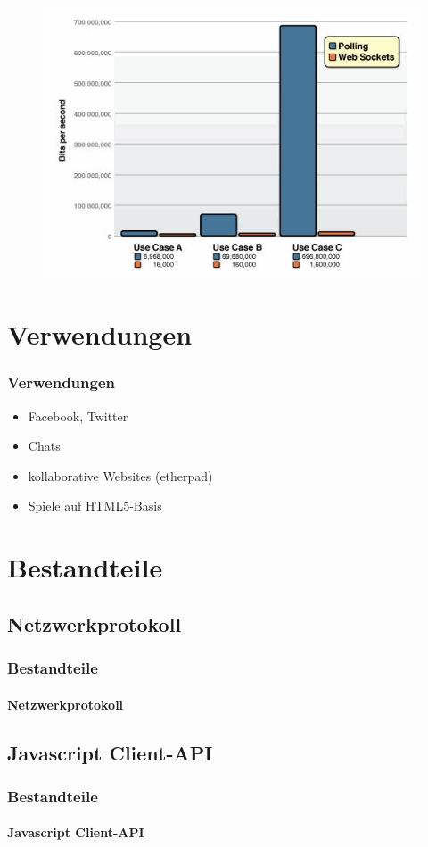 \documentclass{beamer}
\begin{document}
\begin{frame}
\begin{figure}
\begin{center}
\includegraphics[width=12cm]{poll-ws-compare.png}
\end{center}
\end{figure}
\end{frame}

\section{Verwendungen}
\begin{frame}
\frametitle{Verwendungen}
\begin{itemize}
\item Facebook, Twitter
\item Chats
\item kollaborative Websites (etherpad)
\item Spiele auf HTML5-Basis
\end{itemize}
\end{frame}

\section{Bestandteile}

\subsection{Netzwerkprotokoll}
\begin{frame}
\frametitle{Bestandteile}
\framesubtitle{Netzwerkprotokoll}
\end{frame}

\subsection{Javascript Client-API}
\begin{frame}
\frametitle{Bestandteile}
\framesubtitle{Javascript Client-API}
\end{frame}
\end{document}
